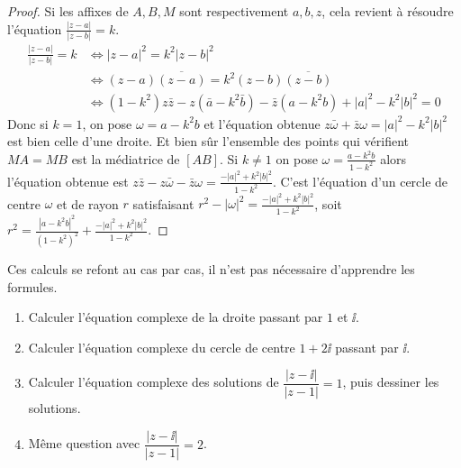 \documentclass[class=report,crop=false]{standalone}
\begin{document}
\begin{proof}
Si les affixes de $A,B,M$
sont respectivement $a,b,z$, cela revient
à résoudre l'équation $\frac{|z-a|}{|z-b|}=k$.
\begin{align*}
\frac{|z-a|}{|z-b|}=k
  & \Longleftrightarrow |z-a|^2 = k^2 |z-b|^2 \\
  & \Longleftrightarrow (z-a)\overline{(z-a)} = k^2 (z-b)\overline{(z-b)} \\
  & \Longleftrightarrow (1-k^2) z \bar z -z(\bar a - k^2 \bar b) - \bar z(a-k^2b) + |a|^2-k^2|b|^2=0
\end{align*}
Donc si $k=1$, on pose $\omega = a-k^2b$ et  l'équation obtenue
$z\bar \omega  + \bar z \omega = |a|^2-k^2|b|^2$ est bien celle d'une droite.
Et bien sûr l'ensemble des points qui vérifient $MA=MB$ est la médiatrice de $[AB]$.
Si $k\neq 1$ on pose $\omega = \frac{a-k^2b}{1-k^2}$ alors l'équation obtenue est
$z \bar z -z \bar \omega - \bar z \omega = \frac{-|a|^2+k^2|b|^2}{1-k^2}$.
C'est l'équation d'un cercle de centre $\omega$ et de rayon $r$ satisfaisant
$r^2-|\omega|^2= \frac{-|a|^2+k^2|b|^2}{1-k^2}$,
soit $r^2 = \frac{|a-k^2b|^2}{(1-k^2)^2}+\frac{-|a|^2+k^2|b|^2}{1-k^2}$.
\end{proof}

Ces calculs se refont au cas par cas, il n'est pas nécessaire d'apprendre les formules.


\begin{miniexercices}
\sauteligne
\begin{enumerate}
  \item Calculer l'équation complexe de la droite passant par $1$ et $\ii$.
  \item Calculer l'équation complexe du cercle de centre $1+2\ii$ passant par $\ii$.
  \item Calculer l'équation complexe des solutions de $\dfrac{|z-\ii|}{|z-1|}=1$, puis dessiner les solutions.
  \item Même question avec $\dfrac{|z-\ii|}{|z-1|}=2$.
\end{enumerate}
\end{miniexercices}


\finchapitre
\end{document}
